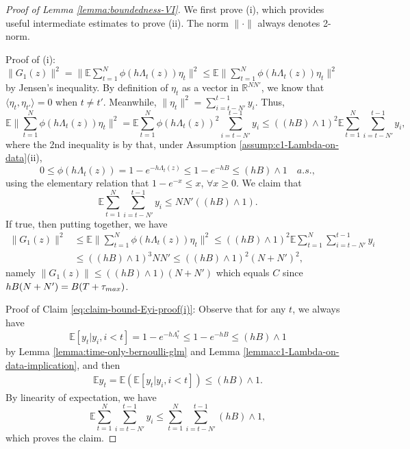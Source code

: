 \documentclass[11pt]{article}
\theoremstyle{remark}
\theoremstyle{plain}
\newcommand{\E}{\mathbb{E}}
\newcommand{\R}{\mathbb{R}}
\begin{document}
\begin{proof}[Proof of Lemma \ref{lemma:boundedness-VI}]
We first prove (i), which provides useful intermediate estimates to prove (ii).
The norm $\| \cdot \|$ always denotes 2-norm.

\vspace{5pt}
Proof of (i): $\| G_1(z) \|^2 = \| \E \sum_{t=1}^N \phi( h \Lambda_t(z)) \eta_t \|^2 \le \E \| \sum_{t=1}^N \phi( h \Lambda_t(z)) \eta_t \|^2 $ by Jensen's inequality.
By definition of $\eta_t$ as a vector in $\R^{NN'}$, we know that 
$\langle \eta_t, \eta_{t'} \rangle =0$ when $t \neq t'$.
Meanwhile,
$\|\eta_t\|^2 = \sum_{i = t-N'}^{t-1} y_i$.
Thus,
\[
\E \| \sum_{t=1}^N \phi( h \Lambda_t(z)) \eta_t \|^2 
= \E \sum_{t=1}^N \phi( h \Lambda_t(z))^2  \sum_{i = t-N'}^{t-1} y_i
\le ( (hB) \wedge 1)^2 \E \sum_{t=1}^N  \sum_{i = t-N'}^{t-1} y_i, 
\]
where the 2nd inequality is by that, under  Assumption \ref{assump:c1-Lambda-on-data}(ii),
\[
0 \le \phi( h \Lambda_t(z)) = 1-e^{- h \Lambda_t(z)} 
\le  1- e^{-hB} \le  (hB) \wedge 1 \quad a.s.,
\]
using the elementary relation that $1-e^{-x} \le x$, $\forall x \ge 0$.
We claim that 
\begin{equation}\label{eq:claim-bound-Eyi-proof(i)}
\E \sum_{t=1}^N  \sum_{i = t-N'}^{t-1} y_i
\le N N'   ( (hB) \wedge 1).
\end{equation}
If true, then putting together, we have
\begin{align*}
\| G_1(z) \|^2
& \le  \E \| \sum_{t=1}^N \phi( h \Lambda_t(z)) \eta_t \|^2
\le ( (hB) \wedge 1)^2 \E \sum_{t=1}^N  \sum_{i = t-N'}^{t-1} y_i \\
& \le  ( (hB) \wedge 1)^3 N N'
\le ( (hB) \wedge 1)^2 (N+N')^2,
\end{align*}
namely $\| G_1(z) \| \le  ( (hB) \wedge 1) (N + N')$ which equals $C$ since 
$ hB(N + N')  = B (T+ \tau_{\rm max})$.

\vspace{5pt}
Proof of Claim \eqref{eq:claim-bound-Eyi-proof(i)}:
Observe that for any $t$, we always have
\begin{equation}\label{eq:Eyt-upperbound-as-proof1}
\E [ y_t | y_i, i <t ] = 1-e^{ - h \Lambda_t^*}
\le   1- e^{- hB}  \le (hB) \wedge 1
\end{equation} 
 by Lemma \ref{lemma:time-only-bernoulli-glm} and Lemma \ref{lemma:c1-Lambda-on-data-implication},
 and then
\begin{align*}
\E y_t 
 = \E \left(  \E[ y_t | y_{i}, i < t]  \right)
 \le  (hB) \wedge 1.
\end{align*}
By linearity of expectation, we have 
\[
\E \sum_{t=1}^N  \sum_{i = t-N'}^{t-1} y_i
\le \sum_{t=1}^N  \sum_{i = t-N'}^{t-1}    (hB) \wedge 1,
\]
which proves the claim.


\end{proof}
\end{document}
